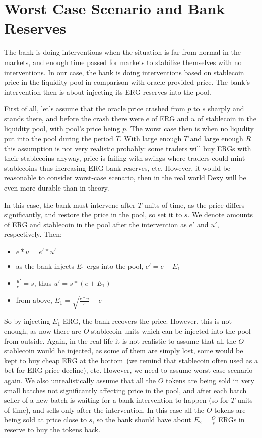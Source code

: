 \documentclass{article}   %
\newcommand{\bc}{ERG}
\newcommand{\sct}{stablecoin}
\newcommand{\dx}{Dexy}
\begin{document}
\section{Worst Case Scenario and Bank Reserves}

The bank is doing interventions when the situation is far from normal in the markets, and enough time passed for markets to stabilize themselves with no interventions. In our case, the bank is doing interventions based on stablecoin price in the liquidity pool in comparison with oracle provided price. The bank's intervention then is about injecting its \bc{} reserves into the pool.  

First of all, let's assume that the oracle price crashed from $p$ to $s$ sharply and stands there, and before the crash there were $e$ of \bc{} and $u$ of \sct{} in the liquidity pool, with pool's price being $p$. The worst case then is when no liqudity put into the pool during the period $T$. With large enough $T$ and large enough $R$ this assumption is not very realistic probably: some traders will buy \bc{}s with their \sct{}s anyway, price is failing with swings where traders could mint \sct{}s thus increasing \bc{} bank reserves, etc. However, it would be reasonable to consider worst-case scenario, then in the real world \dx{} will be even more durable than in theory. 

In this case, the bank must intervene after $T$ units of time, as the price differs significantly, and restore the price in the pool, so set it to $s$. We denote amounts of \bc{} and \sct{} in the pool after the intervention as $e'$ and $u'$, respectively. Then:

\begin{itemize}
  \item{} $e * u = e' * u'$
  \item{} as the bank injects $E_1$ ergs into the pool, $e' = e + E_1$
  \item{} $\frac{u'}{e'} = s$, thus $u' = s * (e + E_1)$ 
  \item{} from above, $E_1 = \sqrt{\frac{e * u}{s}} - e$
\end{itemize}

So by injecting $E_1$ \bc{}, the bank recovers the price. However, this is not enough, as now there are $O$ \sct{} units which can be injected into the pool from outside. 
Again, in the real life it is not realistic to assume that all the $O$ \sct{} would be injected, as some of them are simply lost, some would be kept to buy cheap ERG at the bottom~(we remind that \sct{} often used as a bet for \bc{} price decline), etc. However, we need to assume worst-case scenario again. We also unrealistically assume that all the $O$ tokens are being sold in very small batches not significantly affecting price in the pool, and after each batch seller of a new batch is waiting for a bank intervention to happen (so for $T$ units of time), and sells only after the intervention. In this case all the $O$ tokens are being sold at price close to $s$, so the bank should have about $E_2 = \frac{O}{s}$ \bc{}s in reserve to buy the tokens back.
\end{document}
